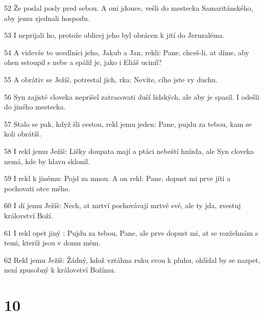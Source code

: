 \par 52 Že poslal posly pred sebou. A oni jdouce, vešli do mestecka Samaritánského, aby jemu zjednali hospodu.
\par 53 I neprijali ho, protože oblicej jeho byl obrácen k jití do Jeruzaléma.
\par 54 A videvše to ucedlníci jeho, Jakub a Jan, rekli: Pane, chceš-li, at díme, aby ohen sstoupil s nebe a spálil je, jako i Eliáš ucinil?
\par 55 A obrátiv se Ježíš, potrestal jich, rka: Nevíte, cího jste vy duchu.
\par 56 Syn zajisté cloveka neprišel zatracovati duší lidských, ale aby je spasil. I odešli do jiného mestecka.
\par 57 Stalo se pak, když šli cestou, rekl jemu jeden: Pane, pujdu za tebou, kam se koli obrátíš.
\par 58 I rekl jemu Ježíš: Lišky doupata mají a ptáci nebeští hnízda, ale Syn cloveka nemá, kde by hlavu sklonil.
\par 59 I rekl k jinému: Pojd za mnou. A on rekl: Pane, dopust mi prve jíti a pochovati otce mého.
\par 60 I dí jemu Ježíš: Nech, at mrtví pochovávají mrtvé své, ale ty jda, zvestuj království Boží.
\par 61 I rekl opet jiný : Pujdu za tebou, Pane, ale prve dopust mi, at se rozžehnám s temi, kteríž jsou v domu mém.
\par 62 Rekl jemu Ježíš: Žádný, kdož vztáhna ruku svou k pluhu, ohlídal by se nazpet, není zpusobný k království Božímu.

\chapter{10}


